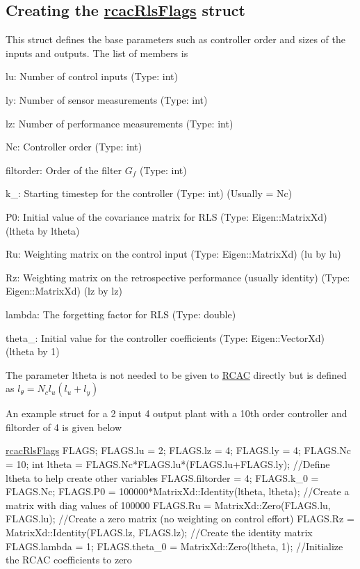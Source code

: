 \subsection*{Creating the \hyperlink{structrcac_rls_flags}{rcac\+Rls\+Flags} struct }

This struct defines the base parameters such as controller order and sizes of the inputs and outputs. The list of members is
\begin{DoxyItemize}
\item lu\+: Number of control inputs (Type\+: int)
\item ly\+: Number of sensor measurements (Type\+: int)
\item lz\+: Number of performance measurements (Type\+: int)
\item Nc\+: Controller order (Type\+: int)
\item filtorder\+: Order of the filter $G_f$ (Type\+: int)
\item k\+\_\+: Starting timestep for the controller (Type\+: int) (Usually = Nc)
\item P0\+: Initial value of the covariance matrix for R\+LS (Type\+: Eigen\+::\+Matrix\+Xd) (ltheta by ltheta)
\item Ru\+: Weighting matrix on the control input (Type\+: Eigen\+::\+Matrix\+Xd) (lu by lu)
\item Rz\+: Weighting matrix on the retrospective performance (usually identity) (Type\+: Eigen\+::\+Matrix\+Xd) (lz by lz)
\item lambda\+: The forgetting factor for R\+LS (Type\+: double)
\item theta\+\_\+: Initial value for the controller coefficients (Type\+: Eigen\+::\+Vector\+Xd) (ltheta by 1)
\end{DoxyItemize}

The parameter ltheta is not needed to be given to \hyperlink{class_r_c_a_c}{R\+C\+AC} directly but is defined as $ l_\theta = N_c l_u(l_u+l_y) $

An example struct for a 2 input 4 output plant with a 10th order controller and filtorder of 4 is given below 
\begin{DoxyCode}
\hyperlink{structrcac_rls_flags}{rcacRlsFlags} FLAGS;
FLAGS.lu = 2;
FLAGS.lz = 4;
FLAGS.ly = 4;
FLAGS.Nc = 10;
\textcolor{keywordtype}{int} ltheta = FLAGS.Nc*FLAGS.lu*(FLAGS.lu+FLAGS.ly); \textcolor{comment}{//Define ltheta to help create other variables}
FLAGS.filtorder = 4;
FLAGS.k\_0 = FLAGS.Nc;
FLAGS.P0 = 100000*MatrixXd::Identity(ltheta, ltheta); \textcolor{comment}{//Create a matrix with diag values of 100000}
FLAGS.Ru = MatrixXd::Zero(FLAGS.lu, FLAGS.lu); \textcolor{comment}{//Create a zero matrix (no weighting on control effort)}
FLAGS.Rz = MatrixXd::Identity(FLAGS.lz, FLAGS.lz); \textcolor{comment}{//Create the identity matrix}
FLAGS.lambda = 1;
FLAGS.theta\_0 = MatrixXd::Zero(ltheta, 1); \textcolor{comment}{//Initialize the RCAC coefficients to zero}
\end{DoxyCode}


